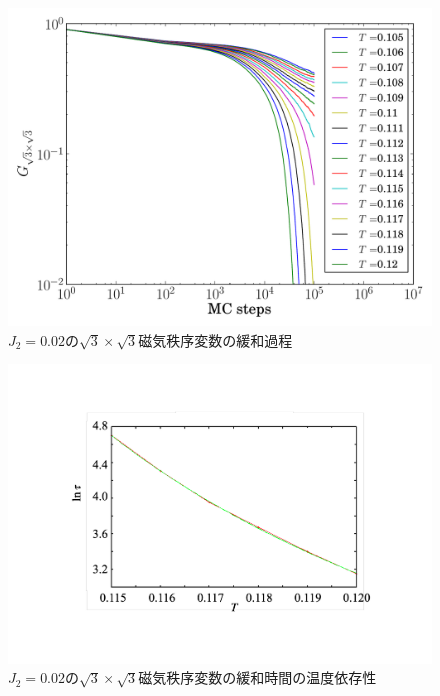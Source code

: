 \documentclass[12pt,titlepage,dvipdfmx]{jarticle}
\begin{document}
\begin{figure}[H]
   \centering
   \includegraphics[width=12cm]{figure/mq_sqrt3_raw_data_j2_0.02.pdf}
   \caption{$J_2=0.02$の$\sqrt{3}\times\sqrt{3}$磁気秩序変数の緩和過程}
\end{figure}

\begin{figure}[H]
   \centering
   \includegraphics[width=12cm]{figure/mq_sqrt3_Tc_j2_0.02.pdf}
   \caption{$J_2=0.02$の$\sqrt{3}\times\sqrt{3}$磁気秩序変数の緩和時間の温度依存性}
\end{figure}
\end{document}
